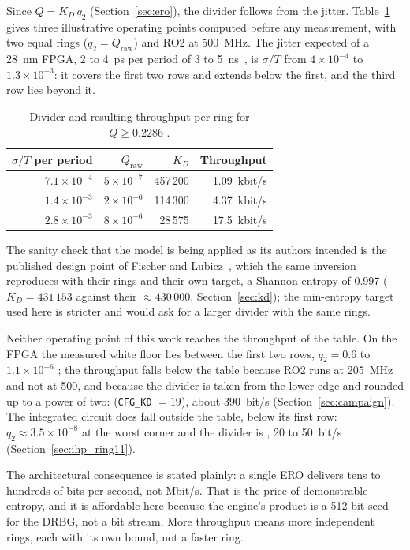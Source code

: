 Since $Q = K_D\,q_2$ (Section~\ref{sec:ero}), the divider follows from
the jitter. Table~\ref{tab:opoint} gives three illustrative operating
points computed before any measurement, with two equal rings
($q_2 = Q_{\mathrm{raw}}$) and RO2 at 500~MHz. The jitter expected of a
28~nm \ac{FPGA}, 2 to 4~ps per period of 3 to
5~ns~\cite{petura_2016_survey}, is $\sigma/T$ from $4\times10^{-4}$ to
$1.3\times10^{-3}$: it covers the first two rows and extends below the
first, and the third row lies beyond it.

\begin{table}[htbp]
\centering
\caption{Divider and resulting throughput per ring for
$Q \ge 0.2286$ \est{}.}
\label{tab:opoint}
\small
\begin{tabular}{@{}rrrr@{}}
\toprule
$\sigma/T$ per period & $Q_{\mathrm{raw}}$ & $K_D$ & Throughput \\
\midrule
$7.1\times10^{-4}$ & $5\times10^{-7}$ & 457\,200 & 1.09~kbit/s \\
$1.4\times10^{-3}$ & $2\times10^{-6}$ & 114\,300 & 4.37~kbit/s \\
$2.8\times10^{-3}$ & $8\times10^{-6}$ & 28\,575  & 17.5~kbit/s \\
\bottomrule
\end{tabular}
\end{table}

The sanity check that the model is being applied as its authors intended
is the published design point of Fischer and
Lubicz~\cite{fischer_2014_embedded}, which the same inversion reproduces
with their rings and their own target, a Shannon entropy of 0.997
($K_D = 431\,153$ against their $\approx 430\,000$,
Section~\ref{sec:kd}); the min-entropy target used here is stricter and
would ask for a larger divider with the same rings.

Neither operating point of this work reaches the throughput of the
table. On the \ac{FPGA} the measured white floor lies between the first
two rows, $q_2 = 0.6$ to $1.1\times10^{-6}$ \meas{}; the throughput falls
below the table because RO2 runs at 205~MHz and not at 500, and because
the divider is taken from the lower edge and rounded up to a power of
two:  (\texttt{CFG\_KD} $= 19$), about 390~bit/s
(Section~\ref{sec:campaign}). The integrated circuit does fall outside
the table, below its first row:
$q_2 \approx 3.5\times10^{-8}$ at the worst corner and the divider is
, 20 to 50~bit/s \est{} (Section~\ref{sec:ihp_ring11}).

The architectural consequence is stated plainly: a single \ac{ERO}
delivers tens to hundreds of bits per second, not Mbit/s. That is the
price of demonstrable entropy, and it is affordable here because the
engine's product is a 512-bit seed for the \ac{DRBG}, not a bit stream.
More throughput means more independent rings, each with its own bound,
not a faster ring.

